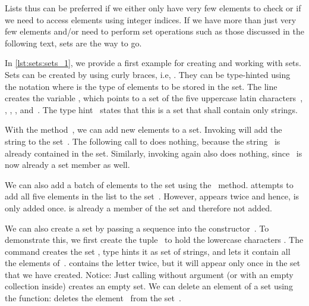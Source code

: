 Lists thus can be preferred if we either only have very few elements to check or if we need to access elements using integer indices.
If we have more than just very few elements and/or need to perform set operations such as those discussed in the following text, sets are the way to go.%
%
\begin{sloppypar}%
In \cref{lst:sets:sets_1}, we provide a first example for creating and working with sets.
Sets can be created by using curly braces, i.e, .
They can be type-hinted using the notation  where  is the type of elements to be stored in the set.
The line  creates the variable , which points to a set of the five uppercase latin characters~, , , , and~.
The type hint~ states that this is a set that shall contain only strings.%
\end{sloppypar}%
%
With the method~, we can add new elements to a set.
Invoking  will add the string  to the set~.
The following call to  does nothing, because the string~ is already contained in the set.
Similarly, invoking  again also does nothing, since~ is now already a set member as well.%
%
\begin{sloppypar}%
We can also add a batch of elements to the set using the ~method.
 attempts to add all five elements in the list \pythonil{["K", "G", "W", "Q", "W"]} to the set~.
However,  appears twice and hence, is only added once.
 is already a member of the set and therefore not added.%
\end{sloppypar}%
%
We can also create a set by passing a sequence into the constructor~.
To demonstrate this, we first create the tuple~ to hold the lowercase characters .
The command  creates the set , type hints it as set of strings, and lets it contain all the elements of~.
 contains the letter  twice, but it will appear only once in the set that we have created.
Notice: Just calling  without argument (or with an empty collection inside) creates an empty set.
We can delete an element of a set using the  function:
 deletes the element~ from the set~.

